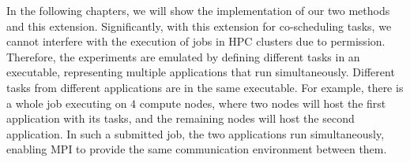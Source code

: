 In the following chapters, we will show the implementation of our two methods and this extension. Significantly, with this extension for co-scheduling tasks, we cannot interfere with the execution of jobs in HPC clusters due to permission. Therefore, the experiments are emulated by defining different tasks in an executable, representing multiple applications that run simultaneously. Different tasks from different applications are in the same executable. For example, there is a whole job executing on $4$ compute nodes, where two nodes will host the first application with its tasks, and the remaining nodes will host the second application. In such a submitted job, the two applications run simultaneously, enabling MPI to provide the same communication environment between them.


